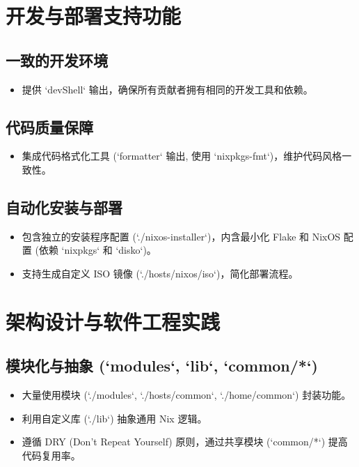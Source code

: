 \documentclass[11pt, a4paper]{article}
\begin{document}
\section{开发与部署支持功能}
    \subsection{一致的开发环境}
        \begin{itemize}
            \item 提供 `devShell` 输出，确保所有贡献者拥有相同的开发工具和依赖。
        \end{itemize}
    \subsection{代码质量保障}
        \begin{itemize}
            \item 集成代码格式化工具 (`formatter` 输出, 使用 `nixpkgs-fmt`)，维护代码风格一致性。
        \end{itemize}
    \subsection{自动化安装与部署}
        \begin{itemize}
            \item 包含独立的安装程序配置 (`./nixos-installer`)，内含最小化 Flake 和 NixOS 配置 (依赖 `nixpkgs` 和 `disko`)。
            \item 支持生成自定义 ISO 镜像 (`./hosts/nixos/iso`)，简化部署流程。
        \end{itemize}

\section{架构设计与软件工程实践}
    \subsection{模块化与抽象 (`modules`, `lib`, `common/*`)}
        \begin{itemize}
            \item 大量使用模块 (`./modules`, `./hosts/common`, `./home/common`) 封装功能。
            \item 利用自定义库 (`./lib`) 抽象通用 Nix 逻辑。
            \item 遵循 DRY (Don't Repeat Yourself) 原则，通过共享模块 (`common/*`) 提高代码复用率。
        \end{itemize}
\end{document}
